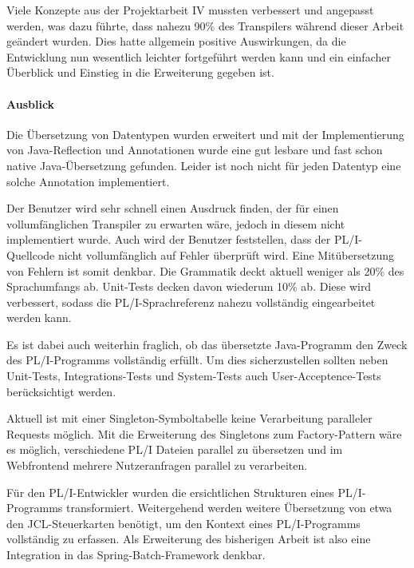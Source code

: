 Viele Konzepte aus der Projektarbeit IV mussten verbessert und angepasst werden, was dazu führte, dass nahezu 90\% des Transpilers
während dieser Arbeit geändert wurden. Dies hatte allgemein positive Auswirkungen, da die Entwicklung nun wesentlich leichter fortgeführt werden kann
und ein einfacher Überblick und Einstieg in die Erweiterung gegeben ist.

\paragraph*{Ausblick} Die Übersetzung von Datentypen wurden erweitert und mit der Implementierung von Java-Reflection und Annotationen wurde eine gut lesbare und fast schon native Java-Übersetzung gefunden. Leider ist noch nicht für jeden Datentyp eine solche Annotation implementiert. 

Der Benutzer wird sehr schnell einen Ausdruck finden, der für einen vollumfänglichen Transpiler zu erwarten wäre, jedoch in diesem nicht implementiert wurde.
Auch wird der Benutzer feststellen, dass der PL/I-Quellcode nicht vollumfänglich auf Fehler überprüft wird. Eine Mitübersetzung von Fehlern ist somit denkbar.
Die Grammatik deckt aktuell weniger als 20\% des Sprachumfangs ab. Unit-Tests decken davon wiederum 10\% ab.
Diese wird verbessert, sodass die PL/I-Sprachreferenz nahezu vollständig eingearbeitet werden kann.

Es ist dabei auch weiterhin fraglich, ob das übersetzte Java-Programm den Zweck des PL/I-Programms vollständig erfüllt. 
Um dies sicherzustellen sollten neben Unit-Tests, Integrations-Tests und System-Tests auch User-Acceptence-Tests berücksichtigt werden.

Aktuell ist mit einer Singleton-Symboltabelle keine Verarbeitung paralleler Requests möglich. Mit die Erweiterung des Singletons zum Factory-Pattern wäre es möglich, verschiedene PL/I Dateien parallel zu übersetzen und im Webfrontend mehrere Nutzeranfragen parallel zu verarbeiten. 

Für den PL/I-Entwickler wurden die ersichtlichen Strukturen eines PL/I-Programms transformiert. Weitergehend werden weitere Übersetzung von etwa den JCL-Steuerkarten benötigt, 
um den Kontext eines PL/I-Programms vollständig zu erfassen. Als Erweiterung des bisherigen Arbeit ist also eine Integration in das Spring-Batch-Framework denkbar.







